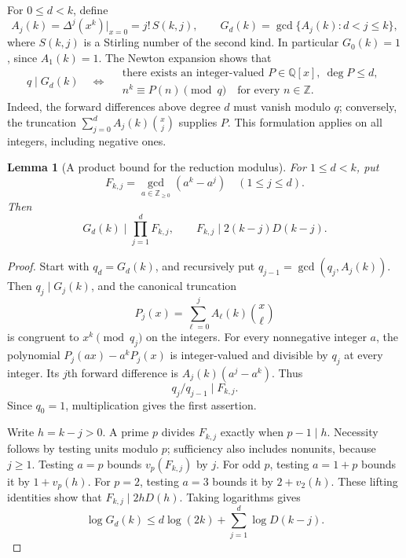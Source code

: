 \documentclass[11pt]{amsart}
\numberwithin{equation}{section}
\newtheorem{lemma}[theorem]{Lemma}
\theoremstyle{remark}
\newcommand{\Z}{\mathbb Z}
\newcommand{\Q}{\mathbb Q}
\begin{document}
For \(0\le d<k\), define
\[
 A_j(k)=\Delta^j(x^k)\big|_{x=0}=j!\,S(k,j),\qquad
 G_d(k)=\gcd\{A_j(k):d<j\le k\},
\]
where \(S(k,j)\) is a Stirling number of the second kind.
In particular \(G_0(k)=1\), since \(A_1(k)=1\).
The Newton expansion shows that
\begin{equation}\label{eq:newtoncriterion}
 q\mid G_d(k)
 \quad\Longleftrightarrow\quad
 \begin{gathered}
 \text{there exists an integer-valued }P\in\Q[x],\ \deg P\le d,\\
 n^k\equiv P(n)\pmod q\quad\text{for every }n\in\Z.
 \end{gathered}
\end{equation}
Indeed, the forward differences above degree \(d\) must vanish modulo
\(q\); conversely, the truncation
\(\sum_{j=0}^d A_j(k)\binom{x}{j}\) supplies \(P\).
This formulation applies on all integers, including negative ones.

\begin{lemma}[A product bound for the reduction modulus]\label{lem:product}
For \(1\le d<k\), put
\[
 F_{k,j}=\gcd_{a\in\Z_{\ge0}}(a^k-a^j)\quad(1\le j\le d).
\]
Then
\begin{equation}\label{eq:product}
 G_d(k)\mid\prod_{j=1}^d F_{k,j},\qquad
 F_{k,j}\mid 2(k-j)D(k-j).
\end{equation}
\end{lemma}
\begin{proof}
Start with \(q_d=G_d(k)\), and recursively put
\(q_{j-1}=\gcd(q_j,A_j(k))\).
Then \(q_j\mid G_j(k)\), and the canonical truncation
\[
 P_j(x)=\sum_{\ell=0}^j A_\ell(k)\binom{x}{\ell}
\]
is congruent to \(x^k\pmod {q_j}\) on the integers.
For every nonnegative integer \(a\), the polynomial
\(P_j(ax)-a^kP_j(x)\) is integer-valued and divisible by \(q_j\) at
every integer. Its \(j\)th forward difference is
\(A_j(k)(a^j-a^k)\). Thus
\[
 q_j/q_{j-1}\mid F_{k,j}.
\]
Since \(q_0=1\), multiplication gives the first assertion.

Write \(h=k-j>0\). A prime \(p\) divides \(F_{k,j}\) exactly when
\(p-1\mid h\). Necessity follows by testing units modulo \(p\);
sufficiency also includes nonunits, because \(j\ge1\).
Testing \(a=p\) bounds \(v_p(F_{k,j})\) by \(j\).
For odd \(p\), testing \(a=1+p\) bounds it by \(1+v_p(h)\).
For \(p=2\), testing \(a=3\) bounds it by \(2+v_2(h)\).
These lifting identities show that \(F_{k,j}\mid2hD(h)\).
Taking logarithms gives
\begin{equation}\label{eq:logG}
 \log G_d(k)\le d\log(2k)+\sum_{j=1}^d\log D(k-j).
\end{equation}
\end{proof}
\end{document}
